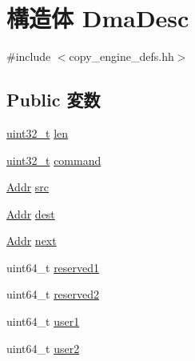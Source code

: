 \hypertarget{structCopyEngineReg_1_1DmaDesc}{
\section{構造体 DmaDesc}
\label{structCopyEngineReg_1_1DmaDesc}
}


{\ttfamily \#include $<$copy\_\-engine\_\-defs.hh$>$}\subsection*{Public 変数}
\begin{DoxyCompactItemize}
\item 
\hyperlink{Type_8hh_a435d1572bf3f880d55459d9805097f62}{uint32\_\-t} \hyperlink{structCopyEngineReg_1_1DmaDesc_a96bbf959016e4411c9e6b9812a8be60a}{len}
\item 
\hyperlink{Type_8hh_a435d1572bf3f880d55459d9805097f62}{uint32\_\-t} \hyperlink{structCopyEngineReg_1_1DmaDesc_af7e471411e95448316f756e3905fdcce}{command}
\item 
\hyperlink{base_2types_8hh_af1bb03d6a4ee096394a6749f0a169232}{Addr} \hyperlink{structCopyEngineReg_1_1DmaDesc_a443054dbf06ec728c73f0cb3d9a3bf12}{src}
\item 
\hyperlink{base_2types_8hh_af1bb03d6a4ee096394a6749f0a169232}{Addr} \hyperlink{structCopyEngineReg_1_1DmaDesc_a359e3f2d60e6b3e4fa8374f0420335f8}{dest}
\item 
\hyperlink{base_2types_8hh_af1bb03d6a4ee096394a6749f0a169232}{Addr} \hyperlink{structCopyEngineReg_1_1DmaDesc_a38e8ae2ab3e2b2039f76c6780c67449c}{next}
\item 
uint64\_\-t \hyperlink{structCopyEngineReg_1_1DmaDesc_a70e1f8ea009867b1bee1dcd6740874a1}{reserved1}
\item 
uint64\_\-t \hyperlink{structCopyEngineReg_1_1DmaDesc_a43927117f60a83134aaf449767b87b6c}{reserved2}
\item 
uint64\_\-t \hyperlink{structCopyEngineReg_1_1DmaDesc_acf4e2414497742ac975ca62ce26dfc8b}{user1}
\item 
uint64\_\-t \hyperlink{structCopyEngineReg_1_1DmaDesc_aaf4c317471b62e4278540e8ad846b0d3}{user2}
\end{DoxyCompactItemize}


